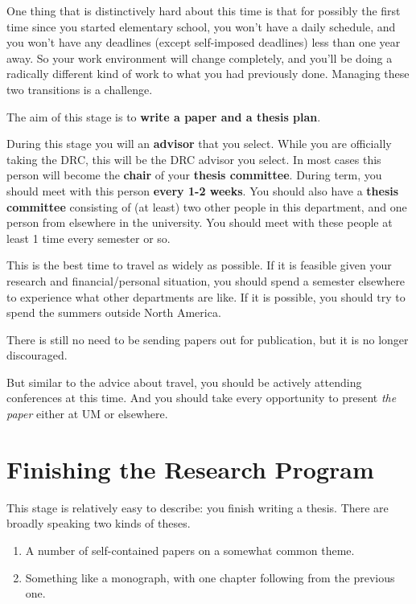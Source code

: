 \documentclass[]{book}
\providecommand{\tightlist}{%
  \setlength{\itemsep}{0pt}\setlength{\parskip}{0pt}}
\begin{document}
One thing that is distinctively hard about this time is that for possibly the first time since you started elementary school, you won't have a daily schedule, and you won't have any deadlines (except self-imposed deadlines) less than one year away. So your work environment will change completely, and you'll be doing a radically different kind of work to what you had previously done. Managing these two transitions is a challenge.

The aim of this stage is to \textbf{write a paper and a thesis plan}.

During this stage you will an \textbf{advisor} that you select. While you are officially taking the DRC, this will be the DRC advisor you select. In most cases this person will become the \textbf{chair} of your \textbf{thesis committee}. During term, you should meet with this person \textbf{every 1-2 weeks}. You should also have a \textbf{thesis committee} consisting of (at least) two other people in this department, and one person from elsewhere in the university. You should meet with these people at least 1 time every semester or so.

This is the best time to travel as widely as possible. If it is feasible given your research and financial/personal situation, you should spend a semester elsewhere to experience what other departments are like. If it is possible, you should try to spend the summers outside North America.

There is still no need to be sending papers out for publication, but it is no longer discouraged.

But similar to the advice about travel, you should be actively attending conferences at this time. And you should take every opportunity to present \emph{the paper} either at UM or elsewhere.

\hypertarget{finishing-the-research-program}{%
\section{Finishing the Research Program}\label{finishing-the-research-program}}

This stage is relatively easy to describe: you finish writing a thesis. There are broadly speaking two kinds of theses.

\begin{enumerate}
\def\labelenumi{\arabic{enumi}.}
\tightlist
\item
  A number of self-contained papers on a somewhat common theme.
\item
  Something like a monograph, with one chapter following from the previous one.
\end{enumerate}
\end{document}
